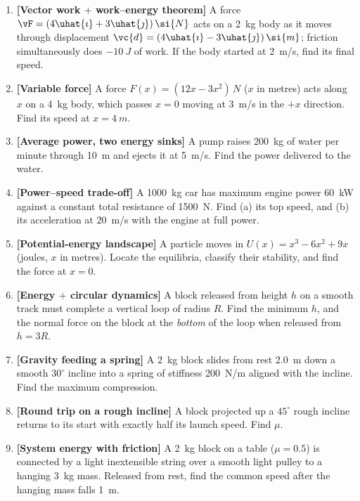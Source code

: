 \begin{enumerate}[label=\textbf{\arabic*.},itemsep=4pt]
\item \textbf{[Vector work $+$ work--energy theorem]} A force $\vF=(4\uhat{\imath}+3\uhat{\jmath})\,\si{N}$ acts
on a \SI{2}{kg} body as it moves through displacement $\vc{d}=(4\uhat{\imath}-3\uhat{\jmath})\,\si{m}$; friction
simultaneously does $\SI{-10}{J}$ of work. If the body started at \SI{2}{m/s}, find its final speed.

\item \textbf{[Variable force]} A force $F(x)=(12x-3x^2)\,\si{N}$ ($x$ in metres) acts along $x$ on a
\SI{4}{kg} body, which passes $x=0$ moving at \SI{3}{m/s} in the $+x$ direction. Find its speed at
$x=\SI{4}{m}$.

\item \textbf{[Average power, two energy sinks]} A pump raises \SI{200}{kg} of water per minute through
\SI{10}{m} and ejects it at \SI{5}{m/s}. Find the power delivered to the water.

\item \textbf{[Power--speed trade-off]} A \SI{1000}{kg} car has maximum engine power \SI{60}{kW} against a
constant total resistance of \SI{1500}{N}. Find (a) its top speed, and (b) its acceleration at
\SI{20}{m/s} with the engine at full power.

\item \textbf{[Potential-energy landscape]} A particle moves in $U(x)=x^3-6x^2+9x$ (joules, $x$ in
metres). Locate the equilibria, classify their stability, and find the force at $x=0$.

\item \textbf{[Energy $+$ circular dynamics]} A block released from height $h$ on a smooth track must
complete a vertical loop of radius $R$. Find the minimum $h$, and the normal force on the block at the
\emph{bottom} of the loop when released from $h=3R$.

\item \textbf{[Gravity feeding a spring]} A \SI{2}{kg} block slides from rest \SI{2.0}{m} down a smooth
$30^\circ$ incline into a spring of stiffness \SI{200}{N/m} aligned with the incline. Find the maximum
compression.

\item \textbf{[Round trip on a rough incline]} A block projected up a $45^\circ$ rough incline returns to
its start with exactly half its launch speed. Find $\mu$.

\item \textbf{[System energy with friction]} A \SI{2}{kg} block on a table ($\mu=0.5$) is connected by a
light inextensible string over a smooth light pulley to a hanging \SI{3}{kg} mass. Released from rest, find the common speed after the hanging
mass falls \SI{1}{m}.


\end{enumerate}
